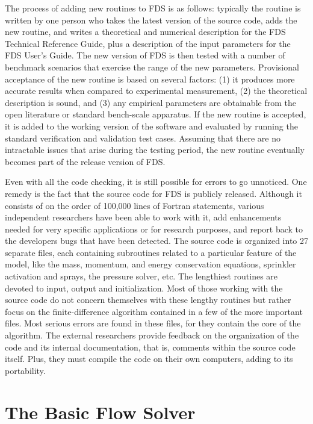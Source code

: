 \documentclass[11pt]{book}
\begin{document}
The process of adding new routines to FDS is as follows: typically the routine is written by one person who takes
the latest version of the source code, adds the new routine, and writes a theoretical and numerical description for the FDS Technical Reference
Guide, plus a description of the input parameters for the FDS User's Guide. The new version of FDS is then tested with a number of benchmark
scenarios that exercise the range of the new parameters.  Provisional acceptance of the new routine is based on several factors: (1) it produces more
accurate results when compared to experimental measurement, (2) the theoretical description is sound, and (3) any empirical parameters are obtainable
from the open literature or standard bench-scale apparatus.  If the new routine is accepted, it is added to the working version of the software and
evaluated by running the standard verification and validation test cases. Assuming that there are no intractable issues that arise
during the testing period, the new routine eventually becomes part of the release version of FDS.

Even with all the code checking, it is still possible for errors to go unnoticed. One remedy is the fact that the source code for
FDS is publicly released. Although it consists of on the order of 100,000 lines of Fortran statements, various independent researchers have been
able to work with it, add enhancements needed for very specific applications or for research purposes, and report back to the developers bugs that
have been detected. The source code is organized into 27 separate files, each containing subroutines related to a particular feature of the model,
like the mass, momentum, and energy conservation equations, sprinkler activation and sprays, the pressure solver, etc. The lengthiest routines
are devoted to input, output and initialization.  Most of those working with the source code do not concern themselves with these lengthy routines
but rather focus on the finite-difference algorithm contained in a few of the more important files. Most serious errors are found in these files, for
they contain the core of the algorithm. The external researchers provide feedback on the organization of the code and its internal documentation,
that is, comments within the source code itself.  Plus, they must compile the code on their own computers, adding to its portability.



\chapter{The Basic Flow Solver}
\end{document}
